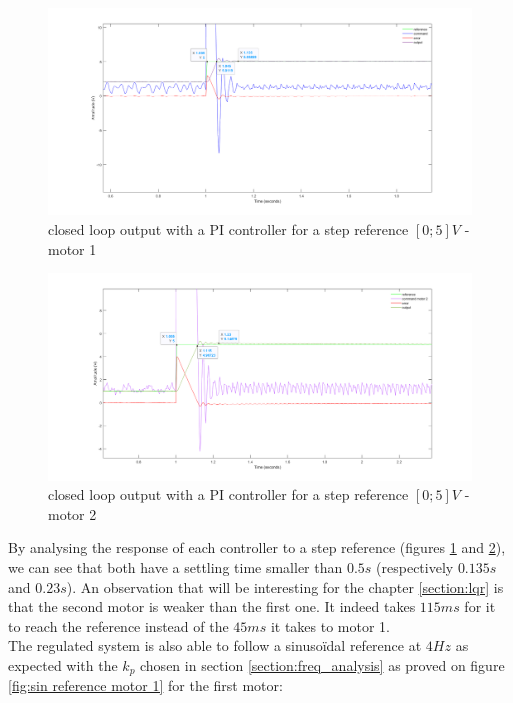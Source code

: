 \begin{figure}
    \centering
    \includegraphics[width=\textwidth]{Pictures/stepRef_motor1.png}
    \caption{closed loop output with a PI controller for a step reference $[0; 5] V$ - motor 1}
    \label{fig:step reference motor 1}
\end{figure}

\begin{figure}
    \centering
    \includegraphics[width=\textwidth]{Pictures/stepRef_motor2.png}
    \caption{closed loop output with a PI controller for a step reference $[0; 5] V$ - motor 2}
    \label{fig:step reference motor 2}
\end{figure}

By analysing the response of each controller to a step reference (figures \ref{fig:step reference motor 1} and 
\ref{fig:step reference motor 2}), we can see that both have
a settling time smaller than $0.5 s$ (respectively $0.135 s$ and $0.23 s$). An observation
that will be interesting for the chapter \ref{section:lqr} is that the second motor is 
weaker than the first one. It indeed takes $115 ms$ for it to reach the reference instead of
the $45 ms$ it takes to motor 1. \\
The regulated system is also able to follow a sinusoïdal reference at $4 Hz$ as expected with
the $k_p$ chosen in section \ref{section:freq_analysis} as proved on figure 
\ref{fig:sin reference motor 1} for the first motor:

